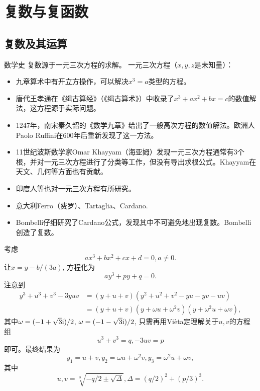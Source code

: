 \chapter{复数与复函数}
\section{复数及其运算}
数学史
复数源于一元三次方程的求解。
一元三次方程（$x,y,z$是未知量）：
\begin{itemize}
    \item 九章算术中有开立方操作，可以解决$x^3=a$类型的方程。
    \item 唐代王孝通在《缉古算经》（《缉古算术》）中收录了$x^3+ax^2+bx=c$的数值解法，这方程源于实际问题。
    \item 1247年，南宋秦久韶的《数学九章》给出了一般高次方程的数值解法。欧洲人Paolo Ruffini在600年后重新发现了这一方法。
    \item 11世纪波斯数学家Omar Khayyam（海亚姆）发现一元三次方程通常有3个根，并对一元三次方程进行了分类等工作，但没有导出求根公式。Khayyam在天文、几何等方面也有贡献。
    \item 印度人等也对一元三次方程有所研究。
    \item 意大利Ferro（费罗）、Tartaglia、Cardano.
    \item Bombelli仔细研究了Cardano公式，发现其中不可避免地出现复数。Bombelli创造了复数。
\end{itemize}
考虑
\begin{equation*}
    ax^3+bx^2+cx+d=0,a\neq 0.
\end{equation*}
让$x=y-b/(3a)$, 方程化为
\begin{equation*}
    ay^3+py+q=0.
\end{equation*}
注意到
\begin{align*}
    y^3+u^3+v^3-3yuv&=(y+u+v)(y^2+u^2+v^2-yu-yv-uv)
    \\ &=(y+u+v)(y+\omega u+\omega^2 v)(y+\omega^2 u+\omega v),
\end{align*}
其中$\omega=(-1+\sqrt{3}\mathrm{i})/2$, $\omega=(-1-\sqrt{3}\mathrm{i})/2$, 只需再用Vi\`eta定理解关于$u,v$的方程组
\begin{equation*}
    u^3+v^3=q, -3uv=p
\end{equation*}
即可。最终结果为
\begin{equation*}
    y_1=u+v,y_2=\omega u+\omega^2 v,y_3=\omega^2 u+\omega v,
\end{equation*}
其中
\begin{equation*}
    u,v=\sqrt[3]{-q/2\pm\sqrt{\Delta}},\Delta=(q/2)^2+(p/3)^3.
\end{equation*}
